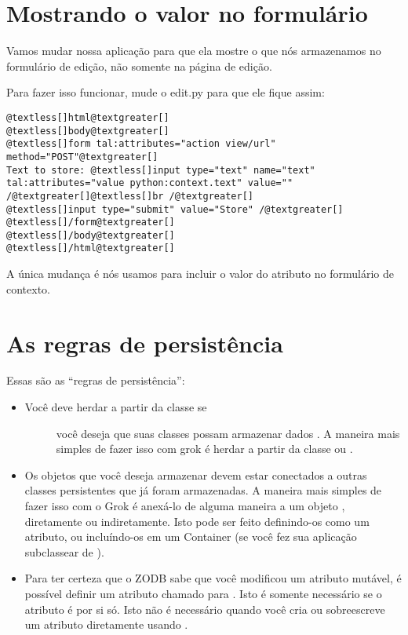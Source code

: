 \documentclass[a4paper,12pt,portuguese]{manual}
\begin{document}
\section{Mostrando  o valor no formulário}

Vamos mudar nossa aplicação para que ela mostre o que nós armazenamos
no formulário de edição, não somente na página de edição.

Para fazer isso funcionar, mude o edit.py para que ele fique assim:

\begin{Verbatim}[commandchars=@\[\]]
@textless[]html@textgreater[]
@textless[]body@textgreater[]
@textless[]form tal:attributes="action view/url" method="POST"@textgreater[]
Text to store: @textless[]input type="text" name="text" tal:attributes="value python:context.text" value="" /@textgreater[]@textless[]br /@textgreater[]
@textless[]input type="submit" value="Store" /@textgreater[]
@textless[]/form@textgreater[]
@textless[]/body@textgreater[]
@textless[]/html@textgreater[]
\end{Verbatim}

A única mudança é nós usamos  para incluir o valor
do atributo  no formulário de contexto.


\section{As regras de persistência}

Essas são as ``regras de persistência'':
\begin{itemize}
\item {} \begin{description}
\item[Você deve herdar a partir da classe  se] \leavevmode
você deseja que suas classes possam armazenar dados . A maneira
mais simples de fazer isso com grok é herdar a partir da classe
 ou .

\end{description}

\item {} 
Os objetos que você deseja armazenar devem estar conectados a outras
classes persistentes que já foram armazenadas. A maneira mais
simples de fazer isso com o Grok é anexá-lo de alguma maneira a um
objeto , diretamente ou indiretamente. Isto pode
ser feito definindo-os como um atributo, ou incluíndo-os em um
Container (se você fez sua aplicação subclassear de ).

\item {} 
Para ter certeza que o ZODB sabe que você modificou um atributo
mutável, é possível definir um atributo chamado  para
. Isto é somente necessário se o atributo é 
por si só. Isto não é necessário quando você cria ou sobreescreve
um atributo diretamente usando \code{=}.

\end{itemize}
\end{document}
